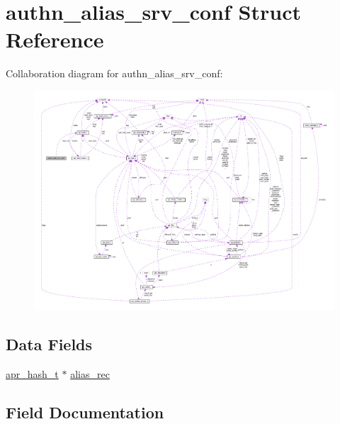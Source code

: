 \hypertarget{structauthn__alias__srv__conf}{}\section{authn\+\_\+alias\+\_\+srv\+\_\+conf Struct Reference}
\label{structauthn__alias__srv__conf}


Collaboration diagram for authn\+\_\+alias\+\_\+srv\+\_\+conf\+:
\nopagebreak
\begin{figure}[H]
\begin{center}
\leavevmode
\includegraphics[width=350pt]{structauthn__alias__srv__conf__coll__graph}
\end{center}
\end{figure}
\subsection*{Data Fields}
\begin{DoxyCompactItemize}
\item 
\hyperlink{structapr__hash__t}{apr\+\_\+hash\+\_\+t} $\ast$ \hyperlink{structauthn__alias__srv__conf_a035de3c208a21196ed5104c064dbea06}{alias\+\_\+rec}
\end{DoxyCompactItemize}


\subsection{Field Documentation}
